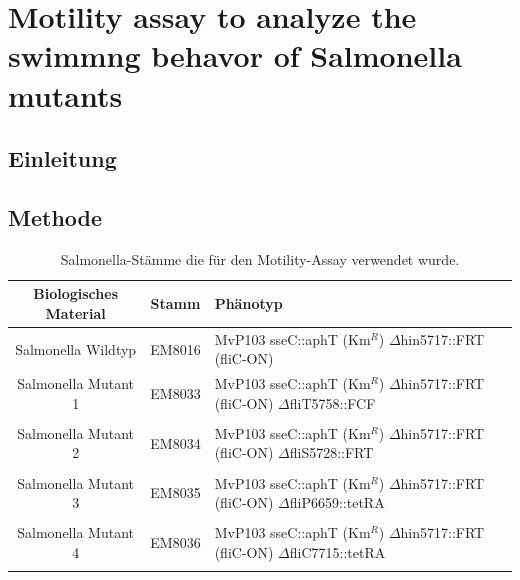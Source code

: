 \documentclass[oneside,10pt,a4paper]{report}
\begin{document}
		\section{Motility assay to analyze the swimmng behavor of Salmonella mutants}
		
			\subsection{Einleitung}
			
			\subsection{Methode}
				\begin{table}[H]
				\centering
				\caption{Salmonella-Stämme die für den Motility-Assay verwendet wurde.}
				\label{tab: exp6-biologisches Material part3}
				\begin{tabular}{ccp{5cm}}
					\toprule
					Biologisches Material& Stamm & Phänotyp\\
					\midrule
					\multirow{3}{*}{\parbox[t]{2cm}{Salmonella Wildtyp }}  & \multirow{3}{*}{EM8016} & \multirow{3}{*}{\parbox[t]{4.5cm}{MvP103 sseC::aphT (Km$^R$) $\Delta$hin5717::FRT (fliC-ON)}}\\
					&&\\
					&&\\
					\multirow{3}{*}{\parbox[t]{2cm}{Salmonella Mutant 1}}  & \multirow{3}{*}{EM8033} & \multirow{3}{*}{\parbox[t]{4.5cm}{MvP103 sseC::aphT (Km$^R$) $\Delta$hin5717::FRT (fliC-ON) $\Delta$fliT5758::FCF}}\\
					&&\\
					&&\\
					&&\\
					\multirow{3}{*}{\parbox[t]{2cm}{Salmonella Mutant 2}}  & \multirow{3}{*}{EM8034} & \multirow{3}{*}{\parbox[t]{4.5cm}{MvP103 sseC::aphT (Km$^R$) $\Delta$hin5717::FRT (fliC-ON) $\Delta$fliS5728::FRT}}\\
					&&\\
					&&\\
					&&\\
					\multirow{3}{*}{\parbox[t]{2cm}{Salmonella Mutant 3}} & \multirow{3}{*}{EM8035} &\multirow{3}{*}{\parbox[t]{4.5cm}{MvP103 sseC::aphT (Km$^R$) $\Delta$hin5717::FRT (fliC-ON) $\Delta$fliP6659::tetRA}} \\
					&&\\
					&&\\
					&&\\
					\multirow{3}{*}{\parbox[t]{2cm}{Salmonella Mutant 4}} & \multirow{3}{*}{EM8036} &\multirow{3}{*}{\parbox[t]{4.5cm}{MvP103 sseC::aphT (Km$^R$) $\Delta$hin5717::FRT (fliC-ON) $\Delta$fliC7715::tetRA}} \\
					&&\\
					&&\\
					&&\\
					\bottomrule			
				\end{tabular}
			\end{table}
			
\end{document}
